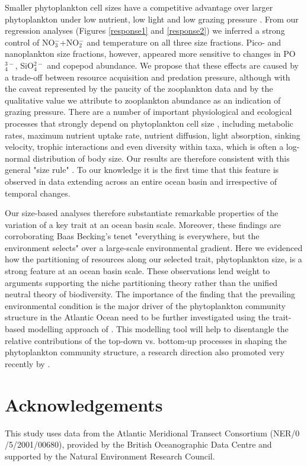 Smaller phytoplankton cell sizes have a competitive advantage over larger phytoplankton under low nutrient, low light and low grazing pressure \citep{Litchman2008, Litchman2010}. From our regression analyses (Figures \ref{response1} and \ref{response2}) we inferred a strong control of NO$_3^-$+NO$_2^-$ and temperature on all three size fractions. Pico- and nanoplankton size fractions, however, appeared more sensitive to changes in PO$_4^{3-}$, SiO$_4^{2-}$ and copepod abundance. We propose that these effects are caused by a trade-off between resource acquisition and predation pressure, although with the caveat represented by the paucity of the zooplankton data and by the qualitative value we attribute to zooplankton abundance as an indication of grazing pressure. There are a number of important physiological and ecological processes that strongly depend on phytoplankton cell size \citep{Kiorboe1993, Cermeno2008a, Finkel2009a}, including metabolic rates, maximum nutrient uptake rate, nutrient diffusion, light absorption, sinking velocity, trophic interactions and even diversity within taxa, which is often a log-normal distribution of body size. Our results are therefore consistent with this general "size rule" \citep{Finkel2009a}. To our knowledge it is the first time that this feature is observed in data extending across an entire ocean basin and irrespective of temporal changes.

Our size-based analyses therefore substantiate remarkable properties of the variation of a key trait at an ocean basin scale. Moreover, these findings are corroborating Baas Becking's tenet "everything is everywhere, but the environment selects" \citep{BaasBecking1934} over a large-scale environmental gradient. Here we evidenced how the partitioning of resources along our selected trait, phytoplankton size, is a strong feature at an ocean basin scale. These observations lend weight to arguments supporting the niche partitioning theory rather than the unified neutral theory of biodiversity. The importance of the finding that the prevailing environmental condition is the major driver of the phytoplankton community structure in the Atlantic Ocean need to be further investigated using the trait-based modelling approach of \citet{Bruggeman2007, Merico2009}. This modelling tool will help to disentangle the relative contributions of the top-down vs. bottom-up processes in shaping the phytoplankton community structure, a research direction also promoted very recently by \citet{Follows2011}.

\section{Acknowledgements}
This study uses data from the Atlantic Meridional Transect Consortium (NER/0\\/5/2001/00680), provided by the British Oceanographic Data Centre and supported by the Natural Environment Research Council. 
